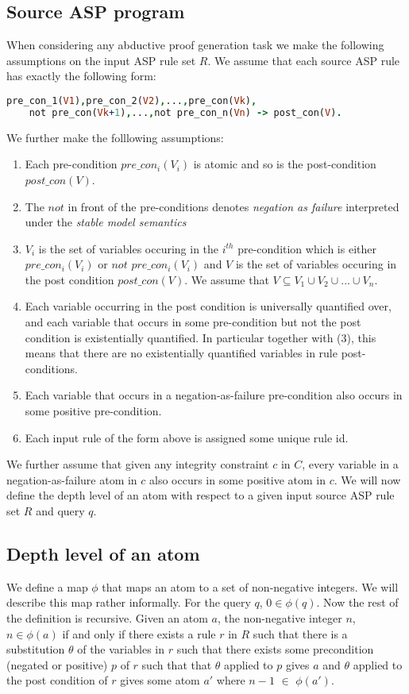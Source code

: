 \documentclass[sigconf]{acmart}
\begin{document}
\subsection{Source ASP program}

When considering any abductive proof generation task we make the following assumptions on the input ASP rule set $R$. We assume that each source ASP rule has exactly the following form:
\begin{lstlisting}[language=Prolog,frame=none]
pre_con_1(V1),pre_con_2(V2),...,pre_con(Vk),
    not pre_con(Vk+1),...,not pre_con_n(Vn) -> post_con(V).
\end{lstlisting}
We further make the folllowing assumptions:

\begin{enumerate}
    \item Each pre-condition $pre\_con_{i}(V_{i})$ is atomic and so is the post-condition $post\_con(V)$.
    \item The $not$ in front of the pre-conditions denotes \textit{negation as failure} interpreted under the \textit{stable model semantics}
    \item $V_{i}$ is the set of variables occuring in the $i^{th}$ pre-condition which is either $pre\_con_{i}(V_{i})$ or $not$ $pre\_con_{i}(V_{i})$ and $V$ is the set of variables occuring in the post condition $post\_con(V)$. We assume that $V\subseteq V_{1}\cup V_{2}\cup ... \cup V_{n}$.
    \item Each variable occurring in the post condition is universally quantified over, and each variable that occurs in some pre-condition but not the post condition is existentially quantified. In particular together with (3), this means that there are no existentially quantified variables in rule post-conditions.
    \item Each variable that occurs in a negation-as-failure pre-condition also occurs in some positive pre-condition.
    \item Each input rule of the form above is assigned some unique rule id.
\end{enumerate}

We further assume that given any integrity constraint $c$ in $C$, every variable in a negation-as-failure atom in $c$ also occurs in some positive atom in $c$. We will now define the depth level of an atom with respect to a given input source ASP rule set $R$ and query $q$.

\subsection{Depth level of an atom}
We define a map $\phi$ that maps an atom to a set of non-negative integers. We will describe this map rather informally. For the query $q$, $0\in \phi(q)$. Now the rest of the definition is recursive. Given an atom $a$, the non-negative integer $n$, $n\in \phi(a)$ if and only if there exists a rule $r$ in $R$ such that there is a substitution $\theta$ of the variables in $r$ such that there exists some precondition (negated or positive) $p$ of $r$ such that that $\theta$ applied to $p$ gives $a$ and $\theta$ applied to the post condition of $r$ gives some atom $a'$ where $n-1$ $\in$ $\phi(a')$.
\end{document}
